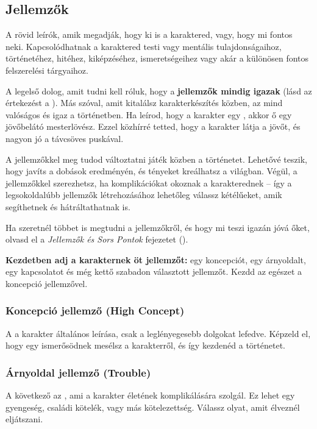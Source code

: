 \subsection{Jellemzők}

A  rövid leírók, amik megadják, hogy ki is a karaktered, vagy, hogy mi fontos neki. Kapcsolódhatnak a karaktered testi vagy mentális tulajdonságaihoz, történetéhez, hitéhez, kiképzéséhez, ismeretségeihez vagy akár a különösen fontos felszerelési tárgyaihoz.

\newpage

A legelső dolog, amit tudni kell róluk, hogy a \textbf{jellemzők mindig igazak} (lásd az értekezést a ). Más szóval, amit kitalálsz karakterkészítés közben, az mind valóságos és igaz a történetben. Ha leírod, hogy a karakter egy , akkor ő egy jövőbelátó mesterlövész. Ezzel közhírré tetted, hogy a karakter látja a jövőt, és nagyon jó a távcsöves puskával.

A jellemzőkkel meg tudod változtatni játék közben a történetet. Lehetővé teszik, hogy javíts a dobások eredményén, és tényeket kreálhatsz a világban. Végül, a jellemzőkkel  szerezhetsz, ha komplikációkat okoznak a karakterednek – így a legsokoldalúbb jellemzők létrehozásához lehetőleg válassz kétélűeket, amik segíthetnek és hátráltathatnak is.

Ha szeretnél többet is megtudni a jellemzőkről, és hogy mi teszi igazán jóvá őket, olvasd el a \emph{Jellemzők és Sors Pontok} fejezetet ().

\textbf{Kezdetben adj a karakternek öt jellemzőt:} egy koncepciót, egy árnyoldalt, egy kapcsolatot és még kettő szabadon választott jellemzőt. Kezdd az egészet a koncepció jellemzővel.

\subsubsection{Koncepció jellemző (High Concept)}

A  a karakter általános leírása, csak a leglényegesebb dolgokat lefedve. Képzeld el, hogy egy ismerősödnek mesélsz a karakterről, és így kezdenéd a történetet.

\subsubsection{Árnyoldal jellemző (Trouble)}

A következő az , ami a karakter életének komplikálására szolgál. Ez lehet egy gyengeség, családi kötelék, vagy más kötelezettség. Válassz olyat, amit élveznél eljátszani.

